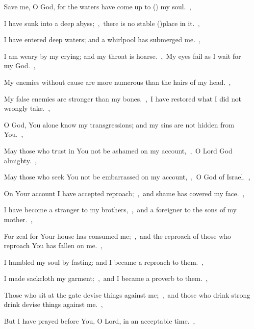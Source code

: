 \documentclass[12pt,twoside,a5paper]{article}
\begin{document}



\begin{normalparskip}
  Save me, O God, for the waters have come up to () my soul.~\sep

  I have sunk into a deep abyss;~\sep\ there is no stable ()place in it.~\sep


  I have entered deep waters; and a whirlpool has submerged me.~\sep

  I am weary by my crying; and my throat is hoarse.~\sep\ My eyes fail as I wait for my God.~\sep

  My enemies without cause are more numerous than the hairs of my head.~\sep

  My false enemies are stronger than my bones.~\sep\ I have restored what I did not wrongly take.~\sep

  O God, You alone know my transgressions; and my sins are not hidden from You.~\sep

  May those who trust in You not be ashamed on my account,~\sep\ O Lord God almighty.~\sep

  May those who seek You not be embarrassed on my account,~\sep\ O God of Israel.~\sep

  On Your account I have accepted reproach;~\sep\ and shame has covered my face.~\sep

  I have become a stranger to my brothers,~\sep\ and a foreigner to the sons of my mother.~\sep

  For zeal for Your house has consumed me;~\sep\ and the reproach of those who reproach You has fallen on me.~\sep

  I humbled my soul by fasting; and I became a reproach to them.~\sep

  I made sackcloth my garment;~\sep\ and I became a proverb to them.~\sep

  Those who sit at the gate devise things against me;~\sep\ and those who drink strong drink devise things against me.~\sep

  But I have prayed before You, O Lord, in an acceptable time.~\sep


\end{normalparskip}
\end{document}
